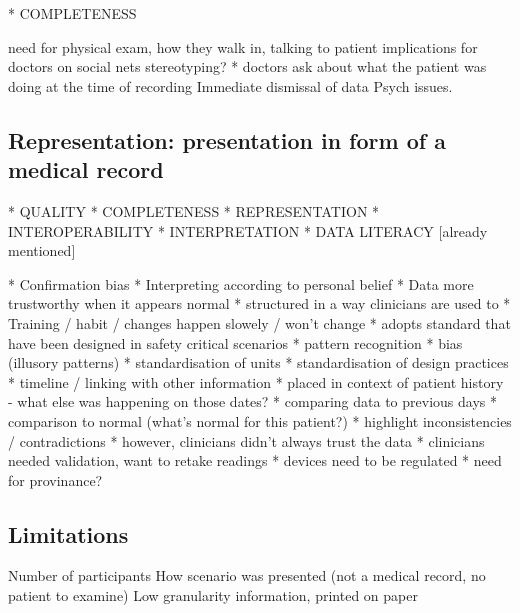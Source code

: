 \documentclass{sigchi}
\begin{document}


* COMPLETENESS



need for physical exam, how they walk in, talking to patient
implications for doctors on social nets
stereotyping?
* doctors ask about what the patient was doing at the time of recording
Immediate dismissal of data
Psych issues.

\subsection{Representation: presentation in form of a medical record} %



* QUALITY
* COMPLETENESS
* REPRESENTATION
* INTEROPERABILITY
* INTERPRETATION
* DATA LITERACY [already mentioned]


* Confirmation bias
* Interpreting according to personal belief
* Data more trustworthy when it appears normal
* structured in a way clinicians are used to
  * Training / habit / changes happen slowely / won't change
  * adopts standard that have been designed in safety critical scenarios
    * pattern recognition
    * bias (illusory patterns)
    * standardisation of units
    * standardisation of design practices
* timeline / linking with other information
  * placed in context of patient history - what else was happening on those dates?
  * comparing data to previous days
  * comparison to normal (what's normal for this patient?)
  * highlight inconsistencies / contradictions
* however, clinicians didn't always trust the data
  * clinicians needed validation, want to retake readings
  * devices need to be regulated
  * need for provinance?

\subsection{Limitations}

Number of participants
How scenario was presented (not a medical record, no patient to examine)
Low granularity information, printed on paper
\end{document}

